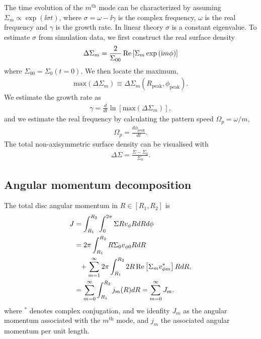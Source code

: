 
The time evolution of the $m^\mathrm{th}$ mode can be characterized by
assuming $\Sigma_m\propto\exp{(\ii \sigma t)}$, where
$\sigma = \omega - \ii\gamma$ is the complex frequency, $\omega$ is
the real frequency and $\gamma$ is the growth rate. In linear theory
$\sigma$ is a constant eigenvalue. 
To estimate $\sigma$ from simulation data, we first construct the real
surface density 
\begin{align}
  \Delta\Sigma_m = \frac{2}{\Sigma_{00}} \operatorname{Re}\left[\Sigma_m \exp{(\mathrm{i}m\phi)}\right]
\end{align}
where $\Sigma_{00} = \Sigma_0(t=0)$. We then locate the maximum,
\begin{align}
  \mathrm{max}(\Delta\Sigma_m) \equiv
  \Delta\Sigma_m(R_\mathrm{peak},\phi_\mathrm{peak}). 
\end{align}
We estimate the growth rate as
\begin{align}
  \gamma = \frac{d}{dt}\ln{\left[\mathrm{max}(\Delta\Sigma_m)\right]}, 
\end{align}
and we estimate the real frequency by calculating the pattern speed
$\Omega_p = \omega/m$,
\begin{align}
  \Omega_p = \frac{d\phi_\mathrm{peak}}{dt}. 
\end{align}
The total non-axisymmetric surface density can be visualised with
\begin{align}
  \Delta\Sigma = \frac{\Sigma - \Sigma_0}{\Sigma_0}. 
\end{align}



\subsection{Angular momentum decomposition}
The total disc angular momentum in $R\in[R_1,R_2]$ is
\begin{align}
  J &= \int_{R_1}^{R_2}\int_0^{2\pi} \Sigma Rv_\phi RdRd\phi \notag\\
  &= 2\pi\int_{R_1}^{R_2}R\Sigma_0 v_{\phi0} R dR \notag\\ 
  &\phantom{=}+
  \sum_{m=1}^\infty2\pi\int_{R_1}^{R_2} 2R\operatorname{Re}\left[\Sigma_m v_{\phi
      m}^*\right] RdR, \notag\\
  &= \sum_{m=0}^\infty \int_{R_1}^{R_2}  j_m(R) dR = \sum_{m=0}^\infty J_m. 
\end{align}
where $^*$ denotes complex conjugation, and we idenfity $J_m$ as the angular momentum 
associated with the $m^\mathrm{th}$ mode, and $j_m$ the associated
angular momentum per unit length. 

